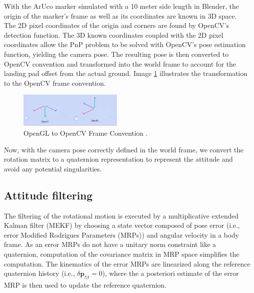 \documentclass[conference]{IEEEtran}
\begin{document}
With the ArUco marker simulated with a 10 meter side length in Blender, the origin of the marker's frame as well as its coordinates are known in 3D space. 
The 2D pixel coordinates of the origin and corners are found by OpenCV's detection function. 
The 3D known coordinates coupled with the 2D pixel coordinates allow the PnP problem to be solved with OpenCV's pose estimation function, yielding the camera pose.
The resulting pose is then converted to OpenCV convention and transformed into the world frame to account for the landing pad offset from the actual ground.
Image \ref{fig:CV_convention} illustrates the transformation to the OpenCV frame convention.

\begin{figure}[ht!] 
    \centerline{\includegraphics[width=0.45\textwidth]{CVtoGL.png}}
    \caption{OpenGL to OpenCV Frame Convention \cite{openCV2024web}.}
    \label{fig:CV_convention}
\end{figure}

Now, with the camera pose correctly defined in the world frame, we convert the rotation matrix to a quaternion representation to represent the attitude and avoid any potential singularities. 


\subsection{Attitude filtering}

The filtering of the rotational motion is executed by a multiplicative extended Kalman filter (MEKF) \cite{markley2003mekf} by choosing a state vector composed of pose error (i.e., error Modified Rodrigues Parameters (MRPs)) and angular velocity in a body frame.
As an error MRPs do not have a unitary norm constraint like a quaternion, computation of the covariance matrix in MRP space simplifies the computation. 
The kinematics of the error MRPs are linearized along the reference quaternion history (i.e., $\delta \boldsymbol{p}_{t|t} = 0$), where the a posteriori estimate of the error MRP is then used to update the reference quaternion. 
\end{document}
